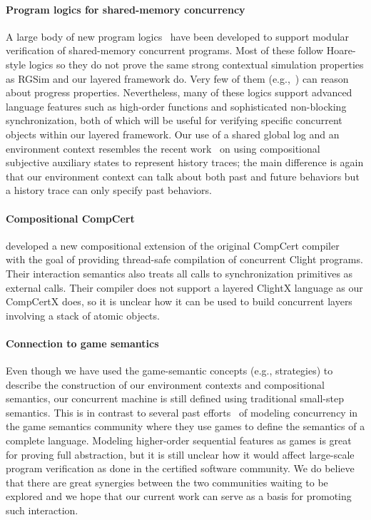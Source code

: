 \paragraph{Program logics for shared-memory concurrency}
A large body of new program
logics~\cite{ohearn:concur04,brookes:concur04,SAGL,vafeiadis:marriage,LRG,verifast,gotsman13,Turon13popl,Turon13icfp,nanevski13,nanevski14,sergey15,sergey15pldi,pinto14,iris15,pinto16}
have been developed to support modular verification of shared-memory
concurrent programs. Most of these follow Hoare-style logics so they
do not prove the same strong contextual simulation properties as RGSim
and our layered framework do. Very few of them (e.g.,~\cite{pinto16})
can reason about progress properties. Nevertheless, many of these
logics support advanced language features such as high-order functions
and sophisticated non-blocking synchronization, both of which will be
useful for verifying specific concurrent objects within our layered
framework.  Our use of a shared global log and an environment context
resembles the recent work~\cite{sergey15} on using compositional
subjective auxiliary states to represent history traces; the main
difference is again that our environment context can talk about both
past and future behaviors but a history trace can only specify past
behaviors. 

\paragraph{Compositional CompCert}
\citet{stewart15} developed a new compositional extension of the
original CompCert compiler~\cite{compcert} with the goal of providing
thread-safe compilation of concurrent Clight programs.  Their
interaction semantics also treats all calls to synchronization
primitives as external calls. Their compiler does not support a layered
ClightX language as our CompCertX does, so it is unclear how it can
be used to build concurrent layers involving a stack of atomic objects.

\paragraph{Connection to game semantics} Even though we have used
the game-semantic concepts (e.g., strategies) to describe the
construction of our environment contexts and compositional semantics,
our concurrent machine is still defined using traditional small-step
semantics.  This is in contrast to several past
efforts~\cite{ghica08,nishimura13,rideau11,abramsky99} of modeling
concurrency in the game semantics community where they use games to
define the semantics of a complete language. Modeling higher-order
sequential features as games is great for proving full abstraction,
but it is still unclear how it would affect large-scale program
verification as done in the certified software community.  We do
believe that there are great synergies between the two communities
waiting to be explored and we hope that our current work can serve as
a basis for promoting such interaction.


